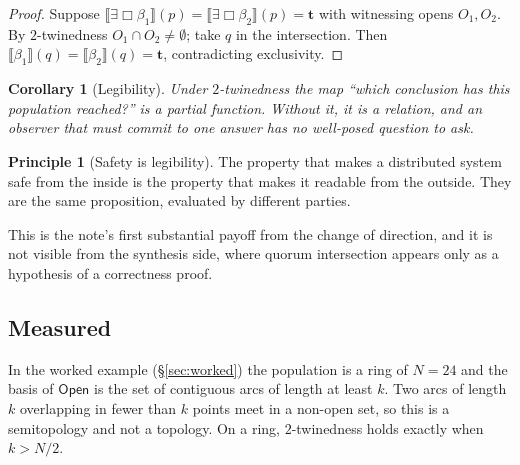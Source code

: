 \documentclass[11pt,a4paper]{article}
\theoremstyle{plain}
\newtheorem{corollary}[theorem]{Corollary}
\theoremstyle{definition}
\newtheorem{principle}[theorem]{Principle}
\theoremstyle{remark}
\newcommand{\Open}{\mathsf{Open}}
\newcommand{\Ebox}{\exists\Box}
\newcommand{\sem}[1]{\llbracket #1 \rrbracket}
\newcommand{\tv}{\mathbf{t}}
\begin{document}
\begin{proof}
Suppose $\sem{\Ebox\beta_1}(p) = \sem{\Ebox\beta_2}(p) = \tv$ with witnessing
opens $O_1, O_2$. By $2$-twinedness $O_1 \cap O_2 \neq \emptyset$; take
$q$ in the intersection. Then $\sem{\beta_1}(q) = \sem{\beta_2}(q) = \tv$,
contradicting exclusivity.
\end{proof}

\begin{corollary}[Legibility]\label{cor:legibility}
Under $2$-twinedness the map ``which conclusion has this population reached?''
is a partial function. Without it, it is a relation, and an observer that must
commit to one answer has no well-posed question to ask.
\end{corollary}

\begin{principle}[Safety is legibility]\label{prin:safetyislegibility}
The property that makes a distributed system safe from the inside is the
property that makes it readable from the outside. They are the same
proposition, evaluated by different parties.
\end{principle}

This is the note's first substantial payoff from the change of direction, and
it is not visible from the synthesis side, where quorum intersection appears
only as a hypothesis of a correctness proof.

\subsection{Measured}

In the worked example (\S\ref{sec:worked}) the population is a ring of $N = 24$
and the basis of $\Open$ is the set of contiguous arcs of length at least $k$.
Two arcs of length $k$ overlapping in fewer than $k$ points meet in a
non-open set, so this is a semitopology and not a topology. On a ring,
$2$-twinedness holds exactly when $k > N/2$.
\end{document}
